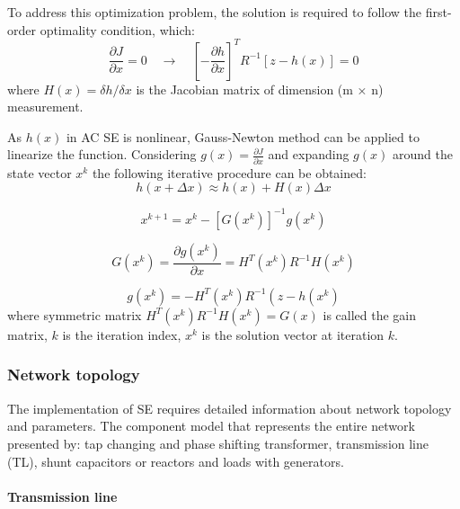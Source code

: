 To address this optimization problem, the solution is required to follow the first-order optimality condition, which:
\begin{equation}
    \frac{\partial J}{\partial x}=0 \quad \rightarrow \quad\left[-\frac{\partial h}{\partial x}\right]^{T} R^{-1}[z-h(x)]=0
    \label{eq:mlm_optcond}
\end{equation}
where \(H(x)=\delta h / \delta x\) is the Jacobian matrix of dimension (m × n) measurement.

As $h(x)$ in AC SE is nonlinear, Gauss-Newton method can be applied to linearize the function. Considering \(g(x)=\frac{\partial J}{\partial x}\) and expanding $g(x)$ around the state vector $x^k$ the following iterative procedure can be obtained:
\begin{equation}
    h(x+\Delta x) \approx h(x)+H(x) \Delta x
\end{equation}

\begin{equation}
    x^{k+1}=x^{k}-\left[G\left(x^{k}\right)\right]^{-1} g\left(x^{k}\right)
\end{equation}

\begin{equation}
    G\left(x^{k}\right)=\frac{\partial g\left(x^{k}\right)}{\partial x}=H^{T}\left(x^{k}\right) R^{-1} H\left(x^{k}\right)
\end{equation}

\begin{equation}
    g\left(x^{k}\right)=-H^{T}\left(x^{k}\right) R^{-1}\left(z-h\left(x^{k}\right)\right.
\end{equation}
where symmetric matrix \(H^{T}\left(x^{k}\right) R^{-1} H\left(x^{k}\right)=G(x)\) is  called the gain matrix, $k$ is the iteration index, $x^k$ is the solution vector at iteration $k$.

\subsubsection{Network topology}
The implementation of SE requires detailed information about network topology and parameters. The component model that represents the entire network presented by: tap changing and phase shifting transformer, transmission line (TL), shunt capacitors or reactors and loads with generators.  

\paragraph{Transmission line}

